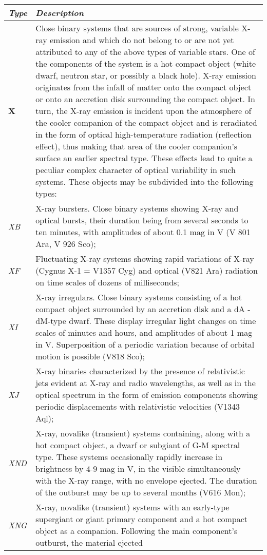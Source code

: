 \begin{longtabu} to \textwidth {l|X}
\toprule
\emph{Type} & \emph{Description}\tabularnewline
\midrule
\textbf{X} & Close binary systems that are sources of strong, variable
X-ray emission and which do not belong to or are not yet attributed to
any of the above types of variable stars. One of the components of the
system is a hot compact object (white dwarf, neutron star, or possibly a
black hole). X-ray emission originates from the infall of matter onto
the compact object or onto an accretion disk surrounding the compact
object. In turn, the X-ray emission is incident upon the atmosphere of
the cooler companion of the compact object and is reradiated in the form
of optical high-temperature radiation (reflection effect), thus making
that area of the cooler companion's surface an earlier spectral type.
These effects lead to quite a peculiar complex character of optical
variability in such systems. These objects may be subdivided into the
following types:\tabularnewline
\emph{XB} & X-ray bursters. Close binary systems showing X-ray and
optical bursts, their duration being from several seconds to ten
minutes, with amplitudes of about 0.1 mag in V (V 801 Ara, V 926
Sco);\tabularnewline
\emph{XF} & Fluctuating X-ray systems showing rapid variations of X-ray
(Cygnus X-1 = V1357 Cyg) and optical (V821 Ara) radiation on time scales
of dozens of milliseconds;\tabularnewline
\emph{XI} & X-ray irregulars. Close binary systems consisting of a hot
compact object surrounded by an accretion disk and a dA - dM-type dwarf.
These display irregular light changes on time scales of minutes and
hours, and amplitudes of about 1 mag in V. Superposition of a periodic
variation because of orbital motion is possible (V818
Sco);\tabularnewline
\emph{XJ} & X-ray binaries characterized by the presence of relativistic
jets evident at X-ray and radio wavelengths, as well as in the optical
spectrum in the form of emission components showing periodic
displacements with relativistic velocities (V1343 Aql);\tabularnewline
\emph{XND} & X-ray, novalike (transient) systems containing, along with
a hot compact object, a dwarf or subgiant of G-M spectral type. These
systems occasionally rapidly increase in brightness by 4-9 mag in V, in
the visible simultaneously with the X-ray range, with no envelope
ejected. The duration of the outburst may be up to several months (V616
Mon);\tabularnewline
\emph{XNG} & X-ray, novalike (transient) systems with an early-type
supergiant or giant primary component and a hot compact object as a
companion. Following the main component's outburst, the material ejected

\end{longtabu}
